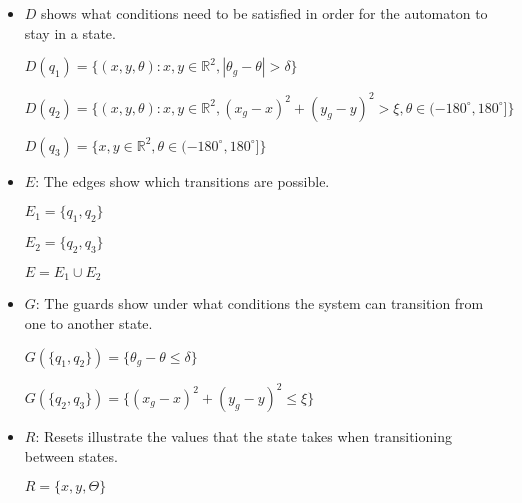 \begin{itemize}
\item
  $D$ shows what conditions need to be satisfied in order for the automaton to
  stay in a state.

  $D(q_1)=\{(x,y,\theta): x,y \in \mathbb{R}^2, |\theta_g-\theta| > \delta\}$

  $D(q_2)=\{(x,y,\theta): x,y \in \mathbb{R}^2, (x_g-x)^2+(y_g-y)^2>\xi, \theta \in(-180^{\circ}, 180^{\circ}]\}$

  $D(q_3)= \{x,y \in \mathbb{R}^2, \theta \in(-180^{\circ}, 180^{\circ}] \}$

\item
  $E$: The edges show which transitions are possible.

  $E_1 = \{ q_1,q_2\}$

  $E_2 = \{ q_2,q_3\}$

  $E = E_1 \cup E_2$

\item
  $G$: The guards show under what conditions the system can transition from one to
  another state.

  $G(\{q_1,q_2\})=\{\theta_g-\theta\le \delta \}$

  $G(\{q_2,q_3\})=\{(x_g-x)^2+(y_g-y)^2 \leq \xi\}$

\item
  $R$: Resets illustrate the values that the state takes when transitioning
  between states.

  $R=\{x,y,\Theta\}$

\end{itemize}
